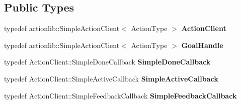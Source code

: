 \subsection*{Public Types}
\begin{DoxyCompactItemize}
\item 
\mbox{\label{classsmacc_1_1SmaccActionClientBase_aea1392d9e41f48bda1de8acaec1c3233}} 
typedef actionlib\+::\+Simple\+Action\+Client$<$ Action\+Type $>$ {\bfseries Action\+Client}
\item 
\mbox{\label{classsmacc_1_1SmaccActionClientBase_a70384df77a0bbf416475e730960a77cf}} 
typedef actionlib\+::\+Simple\+Action\+Client$<$ Action\+Type $>$ {\bfseries Goal\+Handle}
\item 
\mbox{\label{classsmacc_1_1SmaccActionClientBase_a185a419026fcdbec9ddf4703a1505524}} 
typedef Action\+Client\+::\+Simple\+Done\+Callback {\bfseries Simple\+Done\+Callback}
\item 
\mbox{\label{classsmacc_1_1SmaccActionClientBase_ab99def4cdf0522abaf5a3bf7a444cfcb}} 
typedef Action\+Client\+::\+Simple\+Active\+Callback {\bfseries Simple\+Active\+Callback}
\item 
\mbox{\label{classsmacc_1_1SmaccActionClientBase_ad8a68f659fb23e082e75d220515c76f3}} 
typedef Action\+Client\+::\+Simple\+Feedback\+Callback {\bfseries Simple\+Feedback\+Callback}
\end{DoxyCompactItemize}
